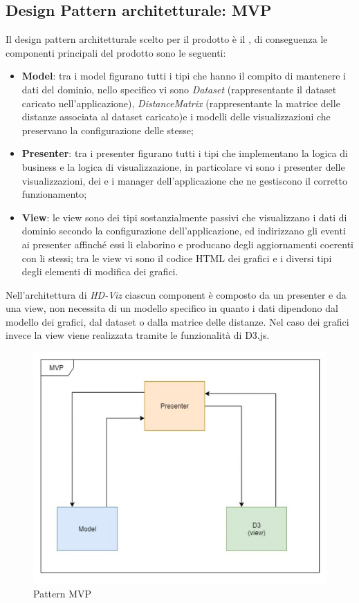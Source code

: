 \documentclass[../manuale_sviluppatore.tex]{subfiles}
\begin{document}
\subsection{Design Pattern architetturale: MVP}
Il design pattern architetturale scelto per il prodotto è il , di 
conseguenza le componenti principali del prodotto sono le seguenti:
\begin{itemize}
	\item \textbf{Model}: tra i model figurano tutti i tipi che hanno il compito di mantenere i dati 
	del dominio, nello specifico vi sono \emph{Dataset} (rappresentante il dataset caricato 
	nell'applicazione), \emph{DistanceMatrix} (rappresentante la matrice delle distanze associata 
	al dataset caricato)e i modelli delle visualizzazioni che preservano la configurazione delle 
	stesse;
	\item \textbf{Presenter}: tra i presenter figurano tutti i tipi che implementano la logica di 
	business e la logica di visualizzazione, in particolare vi sono i presenter delle 
	visualizzazioni, dei  e i manager dell'applicazione che ne gestiscono il 
	corretto funzionamento;
	\item \textbf{View}: le view sono dei tipi sostanzialmente passivi che visualizzano i dati di 
	dominio secondo la configurazione dell'applicazione, ed indirizzano gli eventi ai presenter 
	affinché essi li elaborino e producano degli aggiornamenti coerenti con li stessi; tra le view 
	vi sono il codice HTML dei grafici e i diversi tipi degli elementi di modifica dei grafici.
\end{itemize}

Nell'architettura di \emph{HD-Viz} ciascun component è composto da un presenter e da una view, 
non necessita di un modello specifico in quanto i dati dipendono dal modello dei grafici, dal 
dataset o dalla matrice delle distanze. Nel caso dei grafici invece la view viene realizzata 
tramite le funzionalità di D3.js.

\begin{figure}[H]
	\centering
	\includegraphics[width=13cm]{src/img/patternMVP.jpg}
	\caption{Pattern MVP}
\end{figure}
\end{document}
